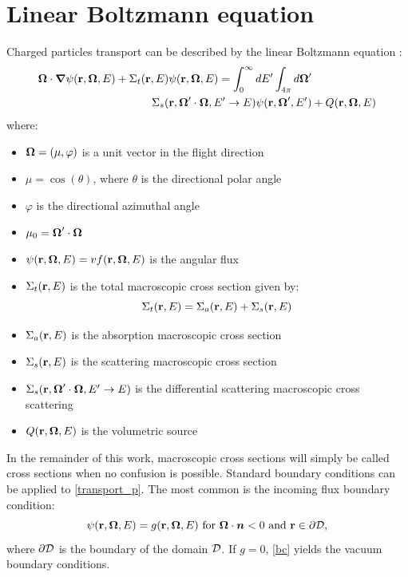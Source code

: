 \section{Linear Boltzmann equation}
Charged particles transport can be described by the linear Boltzmann equation 
\cite{cepxs,galerkin_morel,morel_81}:
\begin{equation}
  \begin{split}
    \bo\cdot \bn \psi(\br,\bo,E) + \Sigma_t(\br,E)\psi(\br,\bo,E) = 
    \int_0^{\infty}dE'\int_{4\pi}d\bo'&  \\
     \Sigma_s(\br,\bo'\cdot\bo,E'\rightarrow E)
     \psi(\br,\bo',E')&+Q(\br,\bo,E)
  \end{split}
\label{transport_p}
\end{equation}
where:
\begin{itemize}
\item $\boldsymbol{\Omega} = (\mu,\varphi)$ is a unit vector in the flight direction
\item $\mu = \cos(\theta)$, where $\theta$ is the directional polar angle
\item $\varphi$ is the directional azimuthal angle
\item $\mu_0 = \boldsymbol{\Omega}'\cdot \boldsymbol{\Omega}$ 
\item $\psi(\mathbf{r},\boldsymbol{\Omega},E) = vf(\mathbf{r},\boldsymbol{\Omega},E)$ is the angular flux
\item $\Sigma_t(\mathbf{r},E)$ is the total macroscopic cross section given by:
\begin{equation}
\Sigma_t(\mathbf{r},E) = \Sigma_a(\mathbf{r},E)+\Sigma_s(\mathbf{r},E)
\end{equation}
\item $\Sigma_a(\mathbf{r},E)$ is the absorption macroscopic cross section
\item $\Sigma_s(\mathbf{r},E)$ is the scattering macroscopic cross section
\item $\Sigma_s(\mathbf{r},\boldsymbol{\Omega}'\cdot \boldsymbol{\Omega}, E'\rightarrow E)$ is the differential
scattering macroscopic cross scattering
\item $Q(\mathbf{r},\boldsymbol{\Omega},E)$ is the volumetric source
\end{itemize}
In the remainder of this work, macroscopic cross sections will simply be called cross
sections when no confusion is possible. Standard boundary conditions can be
applied to \cref{transport_p}. The most common is the incoming flux boundary
condition:
\begin{equation}
  \psi (\br,\bo,E) = g(\br,\bo,E) \textrm{ for }\bo \cdot \bs{n} <0 \textrm{ and }
\br \in \partial \mc{D},
\label{bc}
\end{equation}
where $\partial \mathcal{D}$ is the boundary of the domain $\mathcal{D}$. If $g=0$, 
\cref{bc} yields the vacuum boundary conditions.

